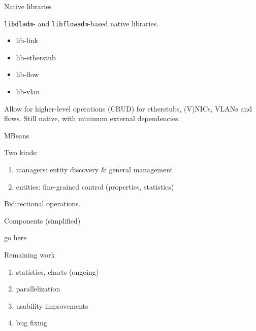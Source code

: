 \documentclass{beamer}
\begin{document}
	\begin{frame}{Native libraries}

		\texttt{libdladm}- and \texttt{libflowadm}-based native libraries.

		\begin{itemize}
			\item lib-link
			\item lib-etherstub
			\item lib-flow
			\item lib-vlan
		\end{itemize}

		Allow for higher-level operations (CRUD) for etherstubs, (V)NICs, VLANs and flows. Still native, with minimum external dependencies.
	
	\end{frame}


	\begin{frame}{MBeans}

		Two kinds:
		
		\begin{enumerate}
			\item managers: entity discovery \& general management
			\item entities: fine-grained control (properties, statistics)
		\end{enumerate}

		Bidirectional operations.
	
	\end{frame}


	\begin{frame}{Components (simplified)}

		go here
	
	\end{frame}


	\begin{frame}{Remaining work}

		\begin{enumerate}
			\item statistics, charts (ongoing)
			\item parallelization
			\item usability improvements
			\item bug fixing
		\end{enumerate}
	
	\end{frame}
\end{document}
